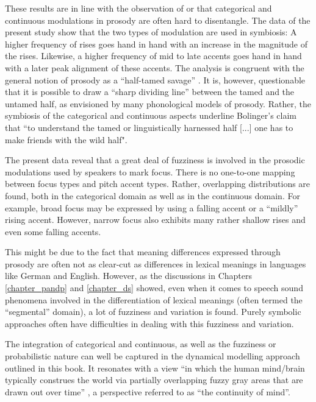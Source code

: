 These results are in line with the observation of \citet{Bolinger1961} or \citet{Ladd2014} that categorical and continuous modulations in prosody are often hard to disentangle. The data of the present study show that the two types of modulation are used in symbiosis: A higher frequency of rises goes hand in hand with an increase in the magnitude of the rises. Likewise, a higher frequency of mid to late accents goes hand in hand with a later peak alignment of these accents. The analysis is congruent with the general notion of prosody as a ``half-tamed savage” \citep{Bolinger1978, Gussenhoven2004}. It is, however, questionable that it is possible to draw a ``sharp dividing line” \citep[49]{Gussenhoven2004} between the tamed and the untamed half, as envisioned by many phonological models of prosody. Rather, the symbiosis of the categorical and continuous aspects underline Bolinger's \citeyearpar[475]{Bolinger1978} claim that ``to understand the tamed or linguistically harnessed half [...] one has to make friends with the wild half".

The present data reveal that a great deal of fuzziness is involved in the prosodic modulations used by speakers to mark focus. There is no one-to-one mapping between focus types and pitch accent types. Rather, overlapping distributions are found, both in the categorical domain as well as in the continuous domain. For example, broad focus may be expressed by using a falling accent or a ``mildly” rising accent. However, narrow focus also exhibits many rather shallow rises and even some falling accents. 

This might be due to the fact that meaning differences expressed through prosody are often not as clear-cut as differences in lexical meanings in languages like German and English. However, as the discussions in Chapters \ref{chapter_pandp} and \ref{chapter_ds} showed, even when it comes to speech sound phenomena involved in the differentiation of lexical meanings (often termed the ``segmental” domain), a lot of fuzziness and variation is found. Purely symbolic approaches often have difficulties in dealing with this fuzziness and variation. 

The integration of categorical and continuous, as well as the fuzziness or probabilistic nature can well be captured in the dynamical modelling approach outlined in this book. It resonates with a view ``in which the human mind/brain typically construes the world via partially overlapping fuzzy gray areas that are drawn out over time” \citep[3]{Spivey2007}, a perspective referred to as ``the continuity of mind”. 

